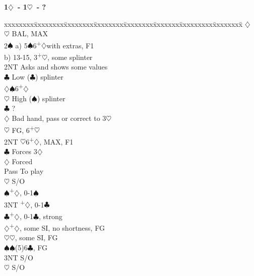 \documentclass[10pt]{article}
\renewcommand{\c}{$\clubsuit$}
\renewcommand{\d}{$\diamondsuit$}
\newcommand{\h}{$\heartsuit$}
\newcommand{\s}{$\spadesuit$}
\newcommand{\p}{\textsuperscript{+}}
\newenvironment{bidtable}[1][]
{\textbf{#1}
  \begin{adjustwidth}{1em}{}
    \addvspace{2pt}
    \begin{tabbing}
      xxxxxxxx\=xxxxxxxx\=xxxxxxxx\=xxxxxxxx\=xxxxxxxx\=xxxxxxx\=xxxxxxxxx\=xxxxxxxx\=\kill}
{\end{tabbing}\end{adjustwidth}\bigskip}%
\begin{document}
\begin{bidtable}[1\d\ - 1\h\ - ?]
     \>      \d {}                                     \\
     \>      \h \> BAL, MAX                                 \\
2\s  \> a) 5\s 6\p\d with extras, F1                            \\%
     \> b) 13-15, 3\p\h, some splinter                          \\%
     \> 2NT  \> Asks and shows some values                      \\
     \>      \c \> Low (\c) splinter                        \\
     \>      \d {}\s 6\p\d                                \\
     \>      \h \> High (\s) splinter                       \\
     \c  \> ?                                               \\
     \d  \> Bad hand, pass or correct to 3\h                \\
     \h  \> FG, 6\p\h                                       \\
2NT  \h 6\p\d, MAX, F1                                      \\
     \c  \> Forces 3\d                                      \\
     \>      \d \> Forced                                   \\
     \>      \>     \> Pass \> To play                          \\
     \>      \>     \h  \> S/O                              \\
     \>      \>     \s  {}\p\d, 0-1\s                     \\
     \>      \>     \> 3NT  \p\d, 0-1\c                     \\
     \>      \>     \c  {}\p\d, 0-1\c, strong             \\
     \d  {}\p\d, some SI, no shortness, FG                              \\
     \h  {}\h, some SI, FG                                \\
     \s  {}\s (5)6\c, FG                                  \\
     \> 3NT  \> S/O                                  \\
     \h  \> S/O                                  \\

\end{bidtable}
\end{document}

